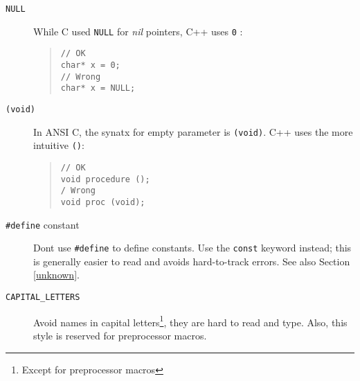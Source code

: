 \begin{description}

  \item[\texttt{NULL}]
  While C used \texttt{NULL} for \emph{nil} pointers, C++ uses \texttt{0} :
  
\begin{quote}
\begin{verbatim}
// OK
char* x = 0;
// Wrong
char* x = NULL;
\end{verbatim}
\end{quote}

  \item[\texttt{(void)}]
  In ANSI C, the synatx for empty parameter is \texttt{(void)}.
  C++ uses the more intuitive \texttt{()}:
  
\begin{quote}
\begin{verbatim}
// OK
void procedure ();
/ Wrong
void proc (void);
\end{verbatim}
\end{quote}

  \item[\texttt{\#define} constant]
  Dont use \texttt{\#define} to define constants.  Use the 
  \texttt{const} keyword instead; this is generally easier to read and 
  avoids hard-to-track errors. See also Section \ref{unknown}.
  
  \item[\texttt{CAPITAL\_LETTERS}] Avoid names in capital
  letters\footnote{Except for preprocessor macros}, they are hard
  to read and type.  Also, this style is reserved for
  preprocessor macros.

\end{description}


